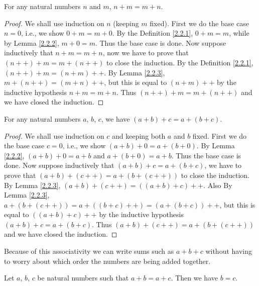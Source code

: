 \begin{proposition}\label{2.2.4}
    For any natural numbers \(n\) and \(m\), \(n + m = m + n\).
\end{proposition}

\begin{proof}
    We shall use induction on \(n\) (keeping \(m\) fixed).
    First we do the base case \(n = 0\), i.e., we show \(0 + m = m + 0\).
    By the Definition \ref{2.2.1}, \(0 + m = m\), while by Lemma \ref{2.2.2}, \(m + 0 = m\).
    Thus the base case is done.
    Now suppose inductively that \(n + m = m + n\), now we have to prove that \((n++) + m = m + (n++)\) to close the induction.
    By the Definition \ref{2.2.1}, \((n++) + m = (n + m)++\).
    By Lemma \ref{2.2.3}, \(m + (n++) = (m + n)++\), but this is equal to \((n + m)++\) by the inductive hypothesis \(n+m=m+n\).
    Thus \((n++) + m = m + (n++)\) and we have closed the induction.
\end{proof}

\begin{proposition}\label{2.2.5}
    For any natural numbers \(a\), \(b\), \(c\), we have \((a + b) + c = a + (b + c)\).
\end{proposition}

\begin{proof}
    We shall use induction on \(c\) and keeping both \(a\) and \(b\) fixed.
    First we do the base case \(c = 0\), i.e., we show \((a + b) + 0 = a + (b + 0)\).
    By Lemma \ref{2.2.2}, \((a + b) + 0 = a + b\) and \(a + (b + 0) = a + b\).
    Thus the base case is done.
    Now suppose inductively that \((a + b) + c = a + (b + c)\), we have to prove that \((a + b) + (c++) = a + (b + (c++))\) to close the induction.
    By Lemma \ref{2.2.3}, \((a + b) + (c++) = ((a + b) + c)++\).
    Also By Lemma \ref{2.2.3}, \(a + (b + (c++)) = a + ((b + c)++) = (a + (b + c))++\), but this is equal to \(((a + b) + c)++\) by the inductive hypothesis \((a + b) + c = a + (b + c)\).
    Thus \((a + b) + (c++) = a + (b + (c++))\) and we have closed the induction.
\end{proof}

\begin{note}
    Because of this associativity we can write sums such as \(a + b + c\) without having to worry about which order the numbers are being added together.
\end{note}

\begin{proposition}\label{2.2.6}
    Let \(a\), \(b\), \(c\) be natural numbers such that \(a + b = a + c\).
    Then we have \(b = c\).
\end{proposition}

